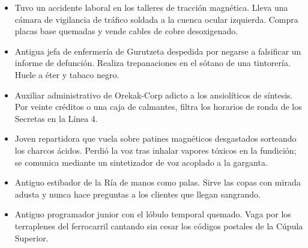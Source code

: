 \begin{itemize}
  \item {} Tuvo un accidente laboral en los talleres de tracción magnética. Lleva una cámara de vigilancia de tráfico soldada a la cuenca ocular izquierda. Compra placas base quemadas y vende cables de cobre desoxigenado.
  \item {} Antigua jefa de enfermería de Gurutzeta despedida por negarse a falsificar un informe de defunción. Realiza trepanaciones en el sótano de una tintorería. Huele a éter y tabaco negro.
  \item {} Auxiliar administrativo de Orekak-Corp adicto a los ansiolíticos de síntesis. Por veinte créditos o una caja de calmantes, filtra los horarios de ronda de los Secretas en la Línea 4.
  \item {} Joven repartidora que vuela sobre patines magnéticos desgastados sorteando los charcos ácidos. Perdió la voz tras inhalar vapores tóxicos en la fundición; se comunica mediante un sintetizador de voz acoplado a la garganta.
  \item {} Antiguo estibador de la Ría de manos como palas. Sirve las copas con mirada adusta y nunca hace preguntas a los clientes que llegan sangrando.
  \item {} Antiguo programador junior con el lóbulo temporal quemado. Vaga por los terraplenes del ferrocarril cantando sin cesar los códigos postales de la Cúpula Superior.
\end{itemize}

